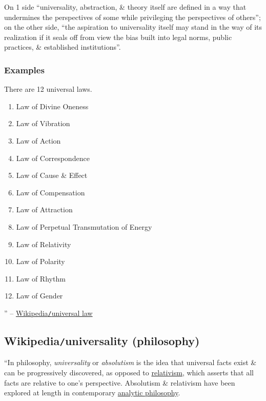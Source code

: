\documentclass{article}
\begin{document}
On 1 side ``universality, abstraction, \& theory itself are defined in a way that undermines the perspectives of some while privileging the perspectives of others''; on the other side, ``the aspiration to universality itself may stand in the way of its realization if it seals off from view the bias built into legal norms, public practices, \& established institutions''.

\subsubsection{Examples}
There are 12 universal laws.
\begin{enumerate}
	\item Law of Divine Oneness
	\item Law of Vibration
	\item Law of Action
	\item Law of Correspondence
	\item Law of Cause \& Effect
	\item Law of Compensation
	\item Law of Attraction
	\item Law of Perpetual Transmutation of Energy
	\item Law of Relativity
	\item Law of Polarity
	\item Law of Rhythm
	\item Law of Gender
\end{enumerate}
'' -- \href{https://en.wikipedia.org/wiki/Universal_law}{Wikipedia{\tt/}universal law}


\subsection{Wikipedia{\tt/}universality (philosophy)}
``In philosophy, {\it universality} or {\it absolutism} is the idea that universal facts exist \& can be progressively discovered, as opposed to \href{https://en.wikipedia.org/wiki/Relativism}{relativism}, which asserts that all facts are relative to one's perspective. Absolutism \& relativism have been explored at length in contemporary \href{https://en.wikipedia.org/wiki/Analytic_philosophy}{analytic philosophy}.
\end{document}
